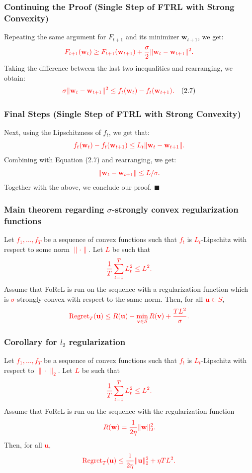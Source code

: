 \documentclass[handout]{beamer}
\begin{document}
\begin{small}
\begin{frame}
    \frametitle{Continuing the Proof (Single Step of FTRL with Strong Convexity)}
    Repeating the same argument for $F_{t+1}$ and its minimizer $\mathbf{w}_{t+1}$, we get:
    \[
    \textcolor{red}{F_{t+1}(\mathbf{w}_t) \geq F_{t+1}(\mathbf{w}_{t+1}) + \frac{\sigma}{2} \|\mathbf{w}_t - \mathbf{w}_{t+1}\|^2.}
    \]
    Taking the difference between the last two inequalities and rearranging, we obtain:
    \[
    \textcolor{red}{\sigma \|\mathbf{w}_t - \mathbf{w}_{t+1}\|^2 \leq f_t(\mathbf{w}_t) - f_t(\mathbf{w}_{t+1}).} \quad (2.7)
    \]
\end{frame}

\begin{frame}
    \frametitle{Final Steps (Single Step of FTRL with Strong Convexity)}
    Next, using the Lipschitzness of $f_t$, we get that:
    \[
    \textcolor{red}{f_t(\mathbf{w}_t) - f_t(\mathbf{w}_{t+1}) \leq L_t \|\mathbf{w}_t - \mathbf{w}_{t+1}\|.}
    \]
    Combining with Equation (2.7) and rearranging, we get:
    \[
    \textcolor{red}{\|\mathbf{w}_t - \mathbf{w}_{t+1}\| \leq L / \sigma.}
    \]
    Together with the above, we conclude our proof. \hfill \(\blacksquare\)
\end{frame}

\begin{frame}
    \frametitle{Main theorem regarding $\sigma$-strongly convex regularization functions}
    Let 
    \textcolor{red}{$f_1, \dots, f_T$} 
    be a sequence of convex functions such that 
    \textcolor{red}{$f_t$} 
    is 
    \textcolor{red}{$L_t$}-Lipschitz 
    with respect to some norm \textcolor{red}{$\|\cdot\|$}. Let 
    \textcolor{red}{$L$} 
    be such that 
    \[
    \textcolor{red}{\frac{1}{T} \sum_{t=1}^{T} L_t^2 \leq L^2.}
    \]
    Assume that FoReL is run on the sequence with a regularization function which is 
    \textcolor{red}{$\sigma$}-strongly-convex 
    with respect to the same norm. Then, for all 
    \textcolor{red}{$\mathbf{u} \in S$},
    \[
    \textcolor{red}{\operatorname{Regret}_T(\mathbf{u}) \leq R(\mathbf{u}) - \min_{\mathbf{v} \in S} R(\mathbf{v}) + \frac{T L^2}{\sigma}.}
    \]
\end{frame}

\begin{frame}
    \frametitle{Corollary for $l_2$ regularization}
    Let 
    \textcolor{red}{$f_1, \dots, f_T$} 
    be a sequence of convex functions such that 
    \textcolor{red}{$f_t$} 
    is 
    \textcolor{red}{$L_t$}-Lipschitz 
    with respect to \textcolor{red}{$\|\cdot\|_2$}. Let 
    \textcolor{red}{$L$} 
    be such that 
    \[
    \textcolor{red}{\frac{1}{T} \sum_{t=1}^{T} L_t^2 \leq L^2.}
    \]
    Assume that FoReL is run on the sequence with the regularization function 
    \[
    \textcolor{red}{R(\mathbf{w}) = \frac{1}{2\eta} \|\mathbf{w}\|_2^2.}
    \]
    Then, for all \textcolor{red}{$\mathbf{u}$},
    \[
    \textcolor{red}{\operatorname{Regret}_T(\mathbf{u}) \leq \frac{1}{2\eta} \|\mathbf{u}\|_2^2 + \eta T L^2.}
    \]
\end{frame}


\end{small}
\end{document}
